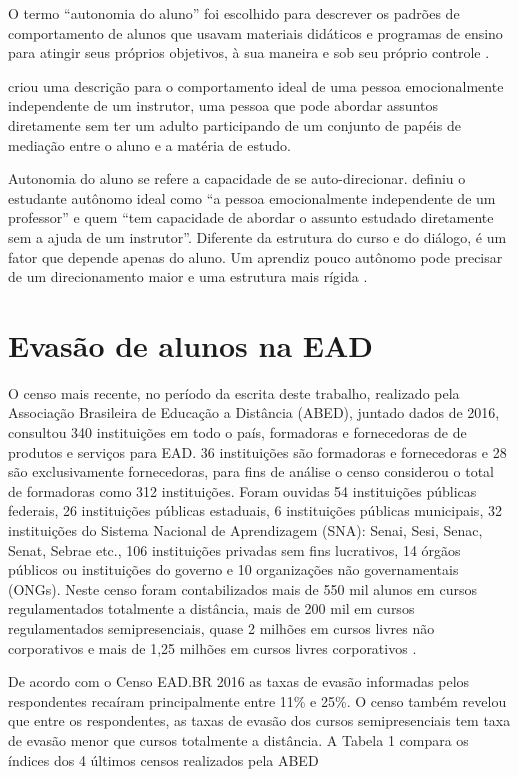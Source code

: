 O termo ``autonomia do aluno'' foi escolhido para descrever os padrões de
comportamento de alunos que usavam materiais didáticos e programas de ensino
para atingir seus próprios objetivos, à sua maneira e sob seu próprio controle
\cite{moore2008teoria}.

 criou uma descrição para o
comportamento ideal de uma pessoa emocionalmente independente de um instrutor,
uma pessoa que pode abordar assuntos diretamente sem ter um adulto participando
de um conjunto de papéis de mediação entre o aluno e a matéria de estudo.

Autonomia do aluno  se refere a capacidade de se auto-direcionar.
 definiu o estudante autônomo ideal como ``a
pessoa emocionalmente independente de um professor'' e quem ``tem capacidade de
abordar o assunto estudado diretamente sem a ajuda de um instrutor''. Diferente
da estrutura do curso e do diálogo, é um fator que depende apenas do aluno. Um
aprendiz pouco autônomo pode precisar de um direcionamento maior e uma estrutura
mais rígida \cite{huang2016understanding}.

\section{Evasão de alunos na EAD}

O censo mais recente, no período da escrita deste trabalho, realizado pela
Associação Brasileira de Educação a Distância (ABED), juntado dados de 2016,
consultou 340 instituições em todo o país, formadoras e fornecedoras de de
produtos e serviços para EAD. 36 instituições são formadoras e fornecedoras e 28
são exclusivamente fornecedoras, para fins de análise o censo considerou o total
de formadoras como 312 instituições. Foram ouvidas 54 instituições públicas
federais, 26 instituições públicas estaduais, 6 instituições públicas
municipais, 32 instituições do Sistema Nacional de Aprendizagem (SNA): Senai,
Sesi, Senac, Senat, Sebrae etc., 106 instituições privadas sem fins lucrativos,
14 órgãos públicos ou instituições do governo e 10 organizações não
governamentais (ONGs). Neste censo foram contabilizados mais de 550 mil alunos
em cursos regulamentados totalmente a distância, mais de 200 mil em cursos
regulamentados semipresenciais,  quase 2 milhões em cursos livres não
corporativos e mais de 1,25 milhões em cursos livres corporativos
\cite{abed2016ead}.

De acordo com o Censo EAD.BR 2016 as taxas de evasão informadas pelos
respondentes recaíram principalmente entre 11\% e 25\%. O censo também revelou
que entre os respondentes, as taxas de evasão dos cursos semipresenciais tem
taxa de evasão menor que cursos totalmente a distância. A Tabela 1 compara os
índices dos 4 últimos censos realizados pela ABED
\cite{abed2013ead,abed2014ead,abed2015ead,abed2016ead}

